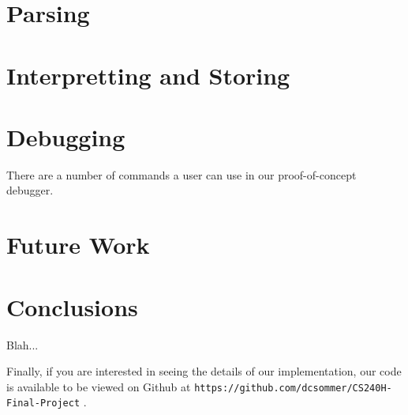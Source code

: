 \documentclass[letterpaper, 10pt]{article}
\newcommand{\ttt}{\texttt}
\begin{document}
\section{Parsing}

\section{Interpretting and Storing}

\section{Debugging}
There are a number of commands a user can use in our proof-of-concept debugger.

\section{Future Work}

\section{Conclusions}
Blah...

Finally, if you are interested in seeing the details of our
implementation, our code is available to be viewed on Github at
\ttt{https://github.com/dcsommer/CS240H-Final-Project} .
\end{document}
